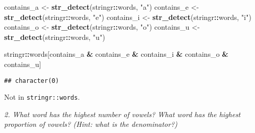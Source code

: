 \documentclass[]{article}
\newenvironment{Shaded}{\begin{snugshade}}{\end{snugshade}}
\newcommand{\KeywordTok}[1]{\textcolor[rgb]{0.13,0.29,0.53}{\textbf{#1}}}
\newcommand{\DataTypeTok}[1]{\textcolor[rgb]{0.13,0.29,0.53}{#1}}
\newcommand{\StringTok}[1]{\textcolor[rgb]{0.31,0.60,0.02}{#1}}
\newcommand{\OperatorTok}[1]{\textcolor[rgb]{0.81,0.36,0.00}{\textbf{#1}}}
\newcommand{\NormalTok}[1]{#1}
\theoremstyle{definition}
\theoremstyle{definition}
\theoremstyle{definition}
\theoremstyle{remark}
\begin{document}
\begin{Shaded}
\begin{Highlighting}[]
\NormalTok{contains_a <-}\StringTok{ }\KeywordTok{str_detect}\NormalTok{(stringr}\OperatorTok{::}\NormalTok{words, }\StringTok{"a"}\NormalTok{)}
\NormalTok{contains_e <-}\StringTok{ }\KeywordTok{str_detect}\NormalTok{(stringr}\OperatorTok{::}\NormalTok{words, }\StringTok{"e"}\NormalTok{)}
\NormalTok{contains_i <-}\StringTok{ }\KeywordTok{str_detect}\NormalTok{(stringr}\OperatorTok{::}\NormalTok{words, }\StringTok{"i"}\NormalTok{)}
\NormalTok{contains_o <-}\StringTok{ }\KeywordTok{str_detect}\NormalTok{(stringr}\OperatorTok{::}\NormalTok{words, }\StringTok{"o"}\NormalTok{)}
\NormalTok{contains_u <-}\StringTok{ }\KeywordTok{str_detect}\NormalTok{(stringr}\OperatorTok{::}\NormalTok{words, }\StringTok{"u"}\NormalTok{)}

\NormalTok{stringr}\OperatorTok{::}\NormalTok{words[contains_a }\OperatorTok{&}\StringTok{ }\NormalTok{contains_e }\OperatorTok{&}\StringTok{ }\NormalTok{contains_i }\OperatorTok{&}\StringTok{ }\NormalTok{contains_o }\OperatorTok{&}\StringTok{ }\NormalTok{contains_u]}
\end{Highlighting}
\end{Shaded}

\begin{verbatim}
## character(0)
\end{verbatim}

Not in \texttt{stringr::words}.

\emph{2. What word has the highest number of vowels? What word has the
highest proportion of vowels? (Hint: what is the denominator?)}

\begin{Shaded}
\end{Shaded}
\end{document}
